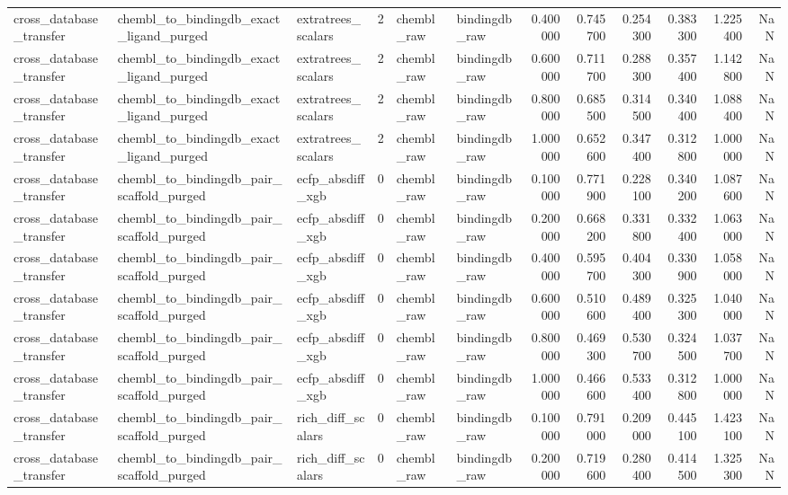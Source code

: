 \begin{longtable}{lllrllrrrrrr}
cross\_database\_transfer & chembl\_to\_bindingdb\_exact\_ligand\_purged & extratrees\_scalars & 2 & chembl\_raw & bindingdb\_raw & 0.400000 & 0.745700 & 0.254300 & 0.383300 & 1.225400 & NaN \\
cross\_database\_transfer & chembl\_to\_bindingdb\_exact\_ligand\_purged & extratrees\_scalars & 2 & chembl\_raw & bindingdb\_raw & 0.600000 & 0.711700 & 0.288300 & 0.357400 & 1.142800 & NaN \\
cross\_database\_transfer & chembl\_to\_bindingdb\_exact\_ligand\_purged & extratrees\_scalars & 2 & chembl\_raw & bindingdb\_raw & 0.800000 & 0.685500 & 0.314500 & 0.340400 & 1.088400 & NaN \\
cross\_database\_transfer & chembl\_to\_bindingdb\_exact\_ligand\_purged & extratrees\_scalars & 2 & chembl\_raw & bindingdb\_raw & 1.000000 & 0.652600 & 0.347400 & 0.312800 & 1.000000 & NaN \\
cross\_database\_transfer & chembl\_to\_bindingdb\_pair\_scaffold\_purged & ecfp\_absdiff\_xgb & 0 & chembl\_raw & bindingdb\_raw & 0.100000 & 0.771900 & 0.228100 & 0.340200 & 1.087600 & NaN \\
cross\_database\_transfer & chembl\_to\_bindingdb\_pair\_scaffold\_purged & ecfp\_absdiff\_xgb & 0 & chembl\_raw & bindingdb\_raw & 0.200000 & 0.668200 & 0.331800 & 0.332400 & 1.063000 & NaN \\
cross\_database\_transfer & chembl\_to\_bindingdb\_pair\_scaffold\_purged & ecfp\_absdiff\_xgb & 0 & chembl\_raw & bindingdb\_raw & 0.400000 & 0.595700 & 0.404300 & 0.330900 & 1.058000 & NaN \\
cross\_database\_transfer & chembl\_to\_bindingdb\_pair\_scaffold\_purged & ecfp\_absdiff\_xgb & 0 & chembl\_raw & bindingdb\_raw & 0.600000 & 0.510600 & 0.489400 & 0.325300 & 1.040000 & NaN \\
cross\_database\_transfer & chembl\_to\_bindingdb\_pair\_scaffold\_purged & ecfp\_absdiff\_xgb & 0 & chembl\_raw & bindingdb\_raw & 0.800000 & 0.469300 & 0.530700 & 0.324500 & 1.037700 & NaN \\
cross\_database\_transfer & chembl\_to\_bindingdb\_pair\_scaffold\_purged & ecfp\_absdiff\_xgb & 0 & chembl\_raw & bindingdb\_raw & 1.000000 & 0.466600 & 0.533400 & 0.312800 & 1.000000 & NaN \\
cross\_database\_transfer & chembl\_to\_bindingdb\_pair\_scaffold\_purged & rich\_diff\_scalars & 0 & chembl\_raw & bindingdb\_raw & 0.100000 & 0.791000 & 0.209000 & 0.445100 & 1.423100 & NaN \\
cross\_database\_transfer & chembl\_to\_bindingdb\_pair\_scaffold\_purged & rich\_diff\_scalars & 0 & chembl\_raw & bindingdb\_raw & 0.200000 & 0.719600 & 0.280400 & 0.414500 & 1.325300 & NaN \\

\end{longtable}
